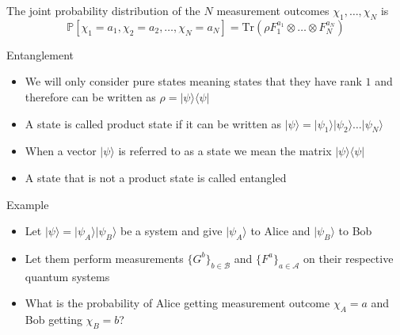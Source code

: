 \begin{frame}{}
    The joint probability distribution of the $N$ measurement outcomes $\chi_1 , \dots , \chi_N$ is 
\begin{equation*}
\mathbb{P}\left[ \chi_1 = a_1, \chi_2 = a_2, \dots , \chi_N = a_N \right] = \text{Tr}(\rho F_1^{a_1} \otimes \dots \otimes F_N^{a_N}) 
\end{equation*}
\end{frame}

\begin{frame}{Entanglement}
\begin{itemize}
    \item We will only consider pure states meaning states that they have rank $1$ and therefore can be written as $\rho = \vert \psi \rangle \langle \psi \vert$
    \item A state is called product state if it can be written as $\vert \psi \rangle = \vert \psi_1 \rangle \vert \psi_2 \rangle \dots \vert \psi_N \rangle$
    \item When a vector $\vert \psi \rangle$ is referred to as a state we mean the matrix $\vert \psi \rangle \langle \psi \vert$
    \item A state that is not a product state is called entangled
\end{itemize}
    
\end{frame}

\begin{frame}{Example}
    \begin{itemize}
        \item Let $\vert \psi \rangle = \vert \psi_A \rangle \vert \psi_B \rangle$ be a system and give $\vert \psi_A \rangle$ to Alice and $\vert \psi_B \rangle$ to Bob
        \item Let them perform measurements $\{ G^b \}_{b \in \mathcal{B}}$ and $\{F^a \}_{a \in \mathcal{A}}$ on their respective quantum systems
        \item What is the  probability of Alice getting measurement outcome $\chi_A = a$ and Bob getting $\chi_B = b$?
    \end{itemize}
\end{frame}

